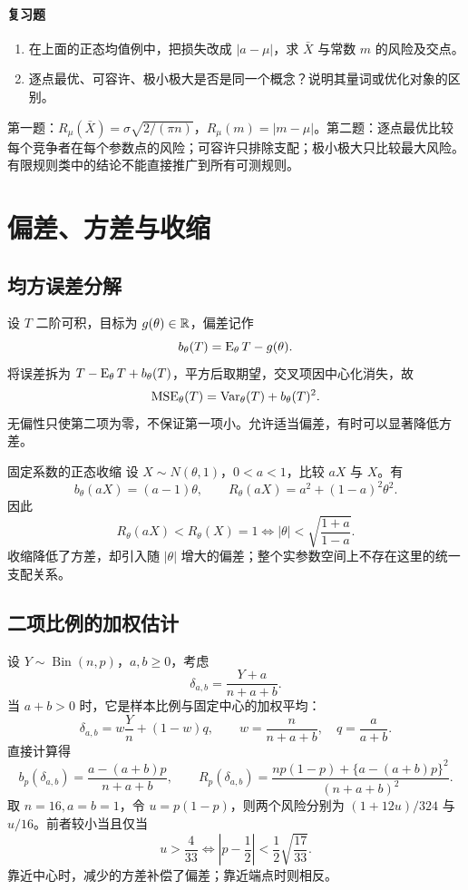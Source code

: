 \paragraph{复习题}
\begin{enumerate}
 \item 在上面的正态均值例中，把损失改成 $|a-\mu|$，求 $\bar X$ 与常数 $m$ 的风险及交点。
 \item 逐点最优、可容许、极小极大是否是同一个概念？说明其量词或优化对象的区别。
\end{enumerate}
\begin{notebox}[答案线索]
第一题：$R_\mu(\bar X)=\sigma\sqrt{2/(\pi n)}$，$R_\mu(m)=|m-\mu|$。第二题：逐点最优比较每个竞争者在每个参数点的风险；可容许只排除支配；极小极大只比较最大风险。有限规则类中的结论不能直接推广到所有可测规则。
\end{notebox}

\section{偏差、方差与收缩}

\subsection{均方误差分解}
设 $T$ 二阶可积，目标为 $g(\theta)\in\mathbb R$，偏差记作
\[
 b_\theta(T)=\operatorname{E}_\theta T-g(\theta).
\]
将误差拆为 $T-\operatorname{E}_\theta T+b_\theta(T)$，平方后取期望，交叉项因中心化消失，故
\[
 \operatorname{MSE}_\theta(T)
 =\operatorname{Var}_\theta(T)+b_\theta(T)^2.
\]
无偏性只使第二项为零，不保证第一项小。允许适当偏差，有时可以显著降低方差。

\begin{examplebox}{固定系数的正态收缩}
设 $X\sim N(\theta,1)$，$0<a<1$，比较 $aX$ 与 $X$。有
\[
 b_\theta(aX)=(a-1)\theta,\qquad
 R_\theta(aX)=a^2+(1-a)^2\theta^2.
\]
因此
\[
 R_\theta(aX)<R_\theta(X)=1
 \iff |\theta|<\sqrt{\frac{1+a}{1-a}}.
\]
收缩降低了方差，却引入随 $|\theta|$ 增大的偏差；整个实参数空间上不存在这里的统一支配关系。
\end{examplebox}

\subsection{二项比例的加权估计}
设 $Y\sim\operatorname{Bin}(n,p)$，$a,b\ge0$，考虑
\[
 \delta_{a,b}=\frac{Y+a}{n+a+b}.
\]
当 $a+b>0$ 时，它是样本比例与固定中心的加权平均：
\[
 \delta_{a,b}=w\frac Yn+(1-w)q,
 \qquad w=\frac n{n+a+b},\quad q=\frac a{a+b}.
\]
直接计算得
\[
 b_p(\delta_{a,b})=\frac{a-(a+b)p}{n+a+b},\qquad
 R_p(\delta_{a,b})=
 \frac{np(1-p)+\{a-(a+b)p\}^2}{(n+a+b)^2}.
\]
取 $n=16,a=b=1$，令 $u=p(1-p)$，则两个风险分别为 $(1+12u)/324$ 与 $u/16$。前者较小当且仅当
\[
 u>\frac4{33}
 \iff \left|p-\frac12\right|<\frac12\sqrt{\frac{17}{33}}.
\]
靠近中心时，减少的方差补偿了偏差；靠近端点时则相反。

